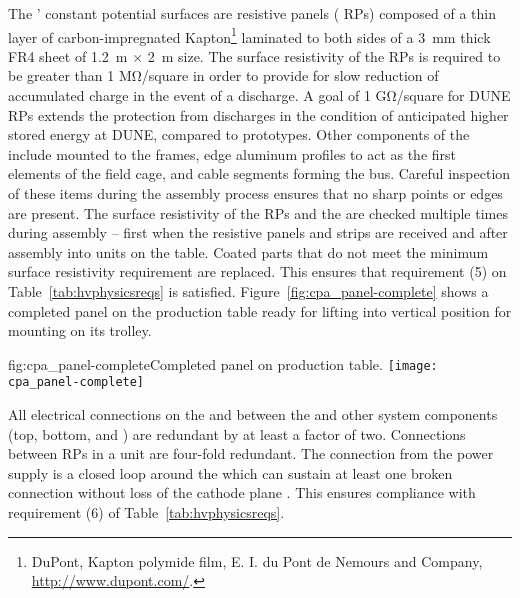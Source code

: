The ' constant potential surfaces are resistive panels ( RPs) composed of a thin layer of carbon-impregnated Kapton\footnote{DuPont\texttrademark{}, Kapton\textsuperscript{\textregistered} polymide film,  E. I. du Pont de Nemours and Company,  \url{http://www.dupont.com/}.} 
 laminated to both sides of a \SI{3}{\milli\meter} thick FR4 sheet of \SI{1.2}{\meter}  $\times$ \SI{2}{\meter} size.  The surface resistivity of the  RPs is required to be greater than 1 M\si{\ohm}/square in order to provide for slow reduction of accumulated charge in the event of a discharge.  A goal of 1 G\si{\ohm}/square for DUNE  RPs extends the protection from discharges in the condition of anticipated higher stored energy at DUNE, compared to prototypes. Other  components of the  include  mounted to the  frames, edge aluminum profiles to act as the first elements of the field cage, and cable segments forming the  bus. Careful inspection of these items during the assembly process ensures that no sharp points or edges are present. The surface resistivity of the  RPs and the  are checked multiple times during assembly -- first when the resistive panels and strips are received and after assembly into  units on the table.  Coated parts that do not meet the minimum surface resistivity requirement are replaced.  This ensures that requirement (5) on Table~\ref{tab:hvphysicsreqs} is satisfied.  Figure~\ref{fig:cpa_panel-complete} shows a completed   panel on the production table ready for lifting into vertical position for mounting on its trolley.

\begin{dunefigure}{fig:cpa_panel-complete}{Completed   panel on production table.}
\texttt{[image: cpa\_panel-complete]}
\end{dunefigure}

All electrical connections on the  and between the  and other  system components (top, bottom, and ) are redundant by at least a factor of two.  Connections between RPs in a unit are four-fold redundant.  The  connection from the  power supply is a closed loop around the  which can sustain at least one broken connection without loss of the cathode plane .  This ensures compliance with %
requirement (6) of Table~\ref{tab:hvphysicsreqs}.

